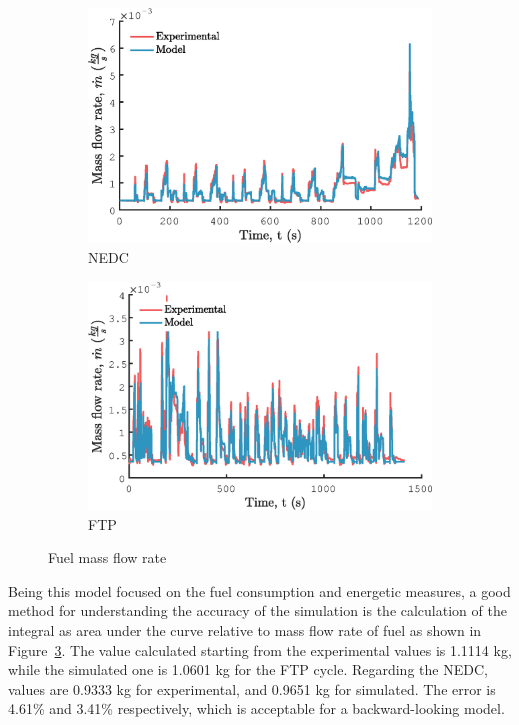 \begin{figure}[ht]
  \centering
  \begin{subfigure}[b]{0.49\textwidth}
    \includegraphics[width=\textwidth]{figures/model/NEDC/m_dot_f.eps}
    \caption{NEDC}
    \label{fig:NEDC_m_dot_fuel}
  \end{subfigure}
  \begin{subfigure}[b]{0.49\textwidth}
    \includegraphics[width=\textwidth]{figures/model/FTP/m_dot_f.eps}
    \caption{FTP}
    \label{fig:FTP_m_dot_fuel}
  \end{subfigure}
  \caption{Fuel mass flow rate}\label{fig:m_dot_fuel}
\end{figure}

Being this model focused on the fuel consumption and energetic measures, a good method for understanding the accuracy of the simulation is the calculation of the integral as area under the curve relative to mass flow rate of fuel as shown in Figure~\ref{fig:m_dot_fuel}. The value calculated starting from the experimental values is 1.1114 kg, while the simulated one is 1.0601 kg for the FTP cycle. Regarding the NEDC, values are 0.9333 kg for experimental, and 0.9651 kg for simulated. The error is 4.61\% and 3.41\% respectively, which is acceptable for a backward-looking model.

